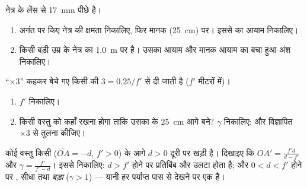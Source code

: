 \begin{exercise}[$\star\star\star$]\label{exo:g11:lenses-and-eye:13}
 नेत्र के लेंस से \qty{17}{mm} पीछे है।
\begin{enumerate}
  \item अनंत पर  किए नेत्र की क्षमता निकालिए, फिर मानक
         (\qty{25}{cm}) पर। इससे  का
         आयाम निकालिए।
  \item किसी बड़ी उम्र के नेत्र का  \qty{1.0}{m} पर है।
        उसका आयाम और मानक आयाम का बचा हुआ अंश निकालिए।
\end{enumerate}
\end{exercise}

\begin{exercise}[$\star\star\star$]\label{exo:g11:lenses-and-eye:14}
``$\times 3$'' कहकर बेचे गए किसी  की 
$3 = 0.25/f'$ से दी जाती है ($f'$ मीटरों में)।
\begin{enumerate}
  \item $f'$ निकालिए।
  \item किसी वस्तु को कहाँ रखना होगा ताकि उसका 
         के \qty{25}{cm} आगे बने? $\gamma$ निकालिए; और विज्ञापित
        $\times 3$ से तुलना कीजिए।
\end{enumerate}
\end{exercise}

\begin{exercise}[$\star\star\star$]\label{exo:g11:lenses-and-eye:15}
कोई  वस्तु किसी  ($\overline{OA} = -d$, $f' > 0$)
के आगे $d > 0$ दूरी पर खड़ी है। दिखाइए कि $\overline{OA'} = \frac{f'd}{d - f'}$ और $\gamma = \frac{f'}{f' - d}$। इससे
निकालिए: $d > f'$ होने पर प्रतिबिंब  और उलटा होता है;
और $0 < d < f'$ होने पर , सीधा तथा \emph{बड़ा} ($\gamma > 1$) ---
यानी हर  पर्याप्त पास से देखने पर एक
 है।
\end{exercise}

